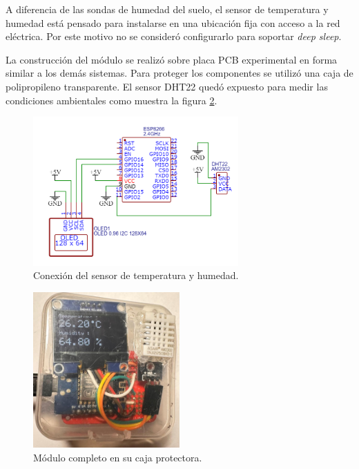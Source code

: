 A diferencia de las sondas de humedad del suelo, el sensor de temperatura y humedad está pensado para instalarse en una ubicación fija 
con acceso a la red eléctrica. Por este motivo no se consideró configurarlo para soportar \textit{deep sleep}.



La construcción del módulo se realizó sobre placa PCB experimental en forma similar a los demás sistemas.
Para proteger los componentes se utilizó una caja de polipropileno transparente. El sensor DHT22 quedó expuesto para medir las condiciones ambientales como muestra la figura \ref{fig:temp_sensor}.


\begin{figure}[!h]
	\centering
	\includegraphics[width=0.7\textwidth]{./Figures/temp_sensor.png}
	\caption[Conexión del sensor de temperatura y humedad]{Conexión del sensor de temperatura y humedad.}
	\label{fig:tempschem}
\end{figure}


\begin{figure}[!h]
	\centering
	\includegraphics[width=0.5\textwidth]{./Figures/sensor_temp.jpg}
	\caption[Módulo completo en su caja protectora]{Módulo completo en su caja protectora.}
	\label{fig:temp_sensor}
\end{figure}


